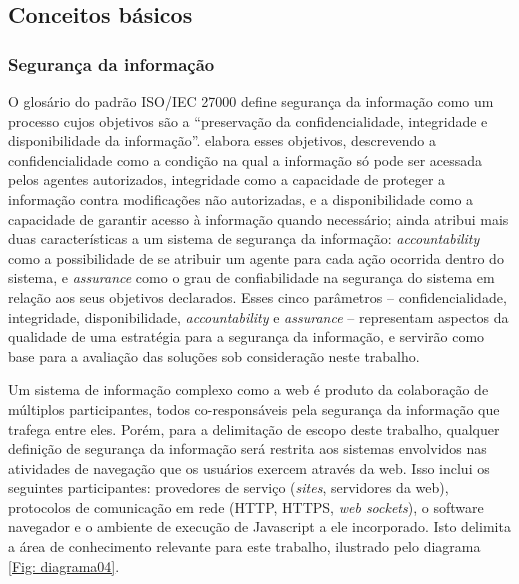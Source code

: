 \subsection{Conceitos básicos}

\subsubsection{Segurança da informação}
O glosário do padrão ISO/IEC 27000 \cite{ISO2016} define segurança da informação como um processo cujos objetivos são a ``preservação da confidencialidade, integridade e disponibilidade da informação''.  elabora esses objetivos, descrevendo a confidencialidade como a condição na qual a informação só pode ser acessada pelos agentes autorizados, integridade como a capacidade de proteger a informação contra modificações não autorizadas, e a disponibilidade como a capacidade de garantir acesso à informação quando necessário;  ainda atribui mais duas características a um sistema de segurança da informação: \textit{accountability} como a possibilidade de se atribuir um agente para cada ação ocorrida dentro do sistema, e \textit{assurance} como o grau de confiabilidade na segurança do sistema em relação aos seus objetivos declarados. Esses cinco parâmetros -- confidencialidade, integridade, disponibilidade, \textit{accountability} e \textit{assurance} -- representam aspectos da qualidade de uma estratégia para a segurança da informação, e servirão como base para a avaliação das soluções sob consideração neste trabalho.

Um sistema de informação complexo como a web é produto da colaboração de múltiplos participantes, todos co-responsáveis pela segurança da informação que trafega entre eles. Porém, para a delimitação de escopo deste trabalho, qualquer definição de segurança da informação será restrita aos sistemas envolvidos nas atividades de navegação que os usuários exercem através da web. Isso inclui os seguintes participantes: provedores de serviço (\textit{sites}, servidores da web), protocolos de comunicação em rede (HTTP, HTTPS, \textit{web sockets}), o software navegador e o ambiente de execução de Javascript a ele incorporado. Isto delimita a área de conhecimento relevante para este trabalho, ilustrado pelo diagrama \ref{Fig: diagrama04}.

